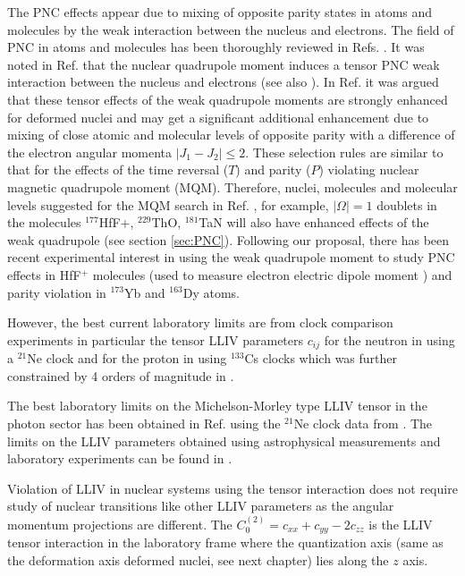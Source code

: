 \documentclass[10pt,a4paper, twoside]{report}
\begin{document}
 
 The PNC effects appear due to mixing of opposite parity states in atoms and molecules by the weak interaction between the nucleus and electrons. The field  of PNC in atoms and molecules has been thoroughly reviewed in Refs.  \cite{KhriplovichPNC,GingesReview,RobertsReview}. It was noted in Ref.  \cite{FS78} that the nuclear quadrupole moment induces a tensor PNC weak interaction between the nucleus and electrons (see also  \cite{KhriplovichPNC,KP91}). In Ref. \cite{Flambaum2016} it was argued that these tensor  effects of the weak quadrupole moments are strongly enhanced for deformed nuclei and may get a significant additional enhancement due to mixing of  close atomic and molecular levels of opposite parity with a  difference of the electron angular momenta $|J_1-J_2| \le 2$. These selection rules are similar to that for the effects of the time reversal ($T$) and parity ($P$) violating nuclear magnetic quadrupole moment (MQM). Therefore, nuclei, molecules and molecular levels  suggested for the MQM search in Ref. \cite{Flambaum2014},  for example,  $|\Omega |=1$ doublets in the molecules $^{177}$HfF+, $^{229}$ThO, $^{181}$TaN will also have enhanced effects of the weak quadrupole (see section \ref{sec:PNC}). Following our proposal, there has been recent experimental interest in using the weak quadrupole moment to study PNC effects in HfF$^{+}$ molecules (used to measure electron electric dipole moment \cite{Cairncross2017}) and parity violation in $^{173}$Yb \cite{Antypas2017} and $^{163}$Dy \cite{Leefer2017} atoms. 
 
  However, the best current laboratory limits are from clock comparison experiments \cite{Prestage1985, Chupp1989, Hohensee2013, Dzuba2016} in particular the tensor LLIV parameters $c_{ij}$ for the neutron in \cite{Smiciklas2011} using a $^{21}$Ne clock and for the proton in \cite{Wolf2006} using $^{133}$Cs clocks which was further constrained by 4 orders of magnitude in \cite{Flambaum2016}.
  
  The best laboratory limits on the Michelson-Morley type LLIV tensor in the photon sector has been obtained in Ref. \cite{FlambaumRomalis2017}  using the $^{21}$Ne clock data from  \cite{Smiciklas2011}.  
The limits on the LLIV parameters  obtained using astrophysical measurements and laboratory experiments can be found in \cite{Kostelecky1999, LorentzDataTables2017}.
 
Violation of LLIV in nuclear systems using the tensor interaction does not require study of nuclear transitions like other LLIV parameters as the angular momentum projections are different. The $C_0^{(2)} = c_{xx} + c_{yy} - 2c_{zz}$ is the LLIV tensor interaction in the laboratory frame where the quantization axis (same as the deformation axis deformed nuclei, see next chapter) lies along the $z$ axis.

\end{document}
